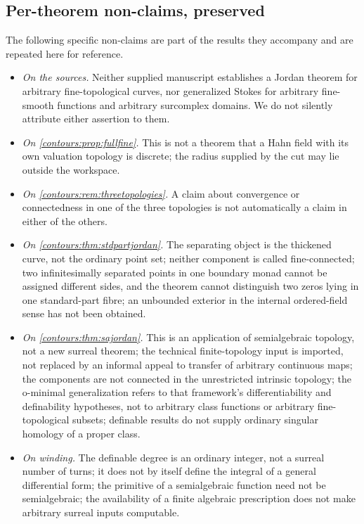 \documentclass[11pt,letterpaper]{article}
\theoremstyle{definition}
\theoremstyle{remark}
\numberwithin{equation}{section}
\begin{document}
\subsection{Per-theorem non-claims, preserved}
The following specific non-claims are part of the results they accompany and are
repeated here for reference.
\begin{itemize}
\item \emph{On the sources.} Neither supplied manuscript establishes a Jordan theorem
for arbitrary fine-topological curves, nor generalized Stokes for arbitrary
fine-smooth functions and arbitrary surcomplex domains. We do not silently attribute
either assertion to them.
\item \emph{On \cref{contours:prop:fullfine}.} This is not a theorem that a Hahn field
with its own valuation topology is discrete; the radius supplied by the cut may lie
outside the workspace.
\item \emph{On \cref{contours:rem:threetopologies}.} A claim about convergence or
connectedness in one of the three topologies is not automatically a claim in either of
the others.
\item \emph{On \cref{contours:thm:stdpartjordan}.} The separating object is the
thickened curve, not the ordinary point set; neither component is called
fine-connected; two infinitesimally separated points in one boundary monad cannot be
assigned different sides, and the theorem cannot distinguish two zeros lying in one
standard-part fibre; an unbounded exterior in the internal ordered-field sense has not
been obtained.
\item \emph{On \cref{contours:thm:sajordan}.} This is an application of semialgebraic
topology, not a new surreal theorem; the technical finite-topology input is imported,
not replaced by an informal appeal to transfer of arbitrary continuous maps; the
components are not connected in the unrestricted intrinsic topology; the o-minimal
generalization refers to that framework's differentiability and definability
hypotheses, not to arbitrary class functions or arbitrary fine-topological subsets;
definable results do not supply ordinary singular homology of a proper class.
\item \emph{On winding.} The definable degree is an ordinary integer, not a surreal
number of turns; it does not by itself define the integral of a general differential
form; the primitive of a semialgebraic function need not be semialgebraic; the
availability of a finite algebraic prescription does not make arbitrary surreal inputs
computable.

\end{itemize}
\end{document}
